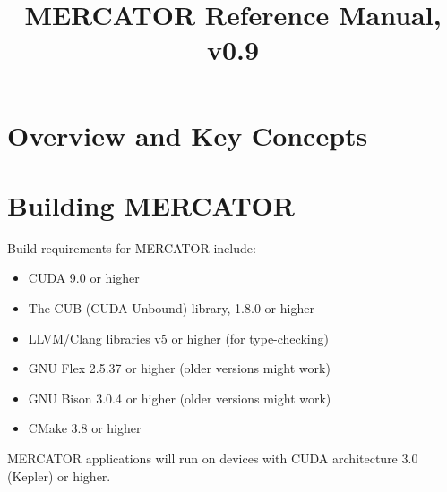 \documentclass[11pt]{article}
\title{MERCATOR Reference Manual, v0.9}
\begin{document}
\maketitle

\section{Overview and Key Concepts}

\section{Building MERCATOR}

Build requirements for MERCATOR include:
\begin{itemize}

\item CUDA 9.0 or higher

\item The CUB (CUDA Unbound) library, 1.8.0 or higher

\item LLVM/Clang libraries v5 or higher (for type-checking)

\item GNU Flex 2.5.37 or higher (older versions might work)

\item GNU Bison 3.0.4 or higher (older versions might work)

\item CMake 3.8 or higher

\end{itemize}
MERCATOR applications will run on devices with CUDA architecture 3.0
(Kepler) or higher.
\end{document}
